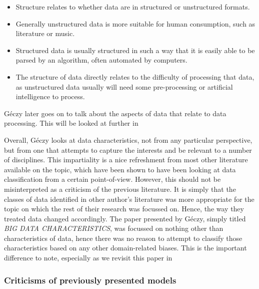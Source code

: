 \documentclass[a4paper,11pt]{article}
\begin{document}
\begin{itemize}
  \item Structure relates to whether data are in structured or unstructured formats.
  \item Generally unstructured data is more suitable for human consumption, such as literature or music.
  \item Structured data is usually structured in such a way that it is easily able to be parsed by an algorithm, often
  automated by computers.
  \item The structure of data directly relates to the difficulty of processing that data, as unstructured data usually
  will need some pre-processing or artificial intelligence to process.
\end{itemize}

G\'eczy later goes on to talk about the aspects of data that relate to data processing. This will be looked at further
in~\sectref{} %

Overall, G\'eczy looks at data characteristics, not from any particular perspective, but from one that attempts to capture
the interests and be relevant to a number of disciplines. This impartiality is a nice refreshment from most other literature
available on the topic, which have been shown to have been looking at data classification from a certain point-of-view.
However, this should not be misinterpreted as a criticism of the previous literature. It is simply that the classes of
data identified in other author's literature was more appropriate for the topic on which the rest of their research was
focussed on. Hence, the way they treated data changed accordingly. The paper presented by G\'eczy, simply titled
\emph{BIG DATA CHARACTERISTICS}, was focussed on nothing other than characteristics of data, hence there was no reason
to attempt to classify those characteristics based on any other domain-related biases. This is the important difference
to note, especially as we revisit this paper in~\sectref{} %



\subsubsection{Criticisms of previously presented models} %
\label{ssub:criticisms_of_previously_presented_models}

\end{document}
